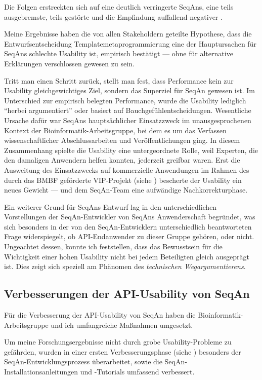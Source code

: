 Die Folgen erstreckten sich auf eine deutlich verringerte  SeqAns, eine teils ausgebremste, teils gestörte  und die Empfindung auffallend negativer .


Meine Ergebnisse haben die von allen Stakeholdern geteilte Hypothese, dass die Entwurfsentscheidung Templatemetaprogrammierung eine der Hauptursachen für SeqAns schlechte Usability ist, empirisch bestätigt --- ohne für alternative Erklärungen verschlossen gewesen zu sein.


Tritt man einen Schritt zurück, stellt man fest, dass Performance kein zur Usability gleichgewichtiges Ziel, sondern das  Superziel für SeqAn gewesen ist. Im Unterschied zur empirisch belegten Performance, wurde die Usability lediglich ``herbei argumentiert'' oder basiert auf Bauchgefühlentscheidungen. Wesentliche Ursache dafür war SeqAns hauptsächlicher Einsatzzweck im unausgesprochenen Kontext der Bioinformatik-Arbeitsgruppe, bei dem es um das Verfassen wissenschaftlicher Abschlussarbeiten und Veröffentlichungen ging. In diesem Zusammenhang spielte die Usability eine untergeordnete Rolle, weil Experten, die den damaligen Anwendern helfen konnten, jederzeit greifbar waren. Erst die Ausweitung des Einsatzzwecks auf kommerzielle Anwendungen im Rahmen des durch das BMBF geförderte VIP-Projekt (siehe ) bescherte der Usability ein neues Gewicht --- und dem SeqAn-Team eine aufwändige Nachkorrekturphase.

Ein weiterer Grund für SeqAns Entwurf lag in den unterschiedlichen Vorstellungen der SeqAn-Entwickler von SeqAns Anwenderschaft begründet, was sich besonders in der von den SeqAn-Entwicklern unterschiedlich beantworteten Frage widerspiegelt, ob API-Endanwender zu dieser Gruppe gehören, oder nicht. Ungeachtet dessen, konnte ich feststellen, dass das Bewusstsein für die Wichtigkeit einer hohen Usability nicht bei jedem Beteiligten gleich ausgeprägt ist. Dies zeigt sich speziell am Phänomen des \textit{technischen Wegargumentierens}.


\subsection{Verbesserungen der API-Usability von SeqAn}
Für die Verbesserung der API-Usability von SeqAn haben die Bioinformatik-Arbeitsgruppe und ich umfangreiche Maßnahmen umgesetzt.

Um meine Forschungsergebnisse nicht durch grobe Usability-Probleme zu gefährden, wurden in einer ersten Verbesserungsphase (siehe ) besonders der SeqAn-Entwicklungsprozess überarbeitet, sowie die SeqAn-Installationsanleitungen und -Tutorials umfassend verbessert.

